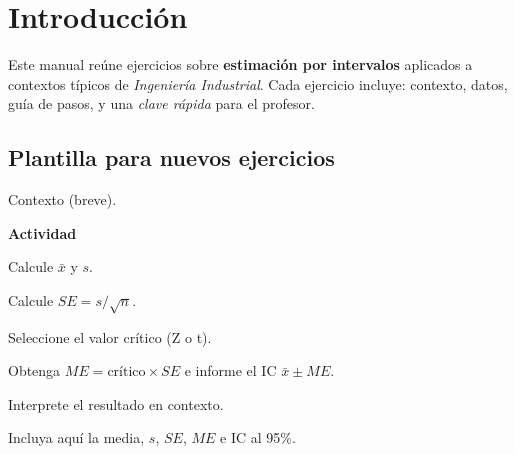 \section{Introducción}
Este manual reúne ejercicios sobre \textbf{estimación por intervalos} aplicados a contextos típicos de \textit{Ingeniería Industrial}.
Cada ejercicio incluye: contexto, datos, guía de pasos, y una \emph{clave rápida} para el profesor.

\begin{clave}
\subsection*{Plantilla para nuevos ejercicios}
\begin{ejercicio}
Contexto (breve).


\textbf{Actividad}
\begin{pasos}
  \item Calcule $\bar{x}$ y $s$.
  \item Calcule $SE=s/\sqrt{n}$.
  \item Seleccione el valor crítico (Z o t).
  \item Obtenga $ME=\text{crítico}\times SE$ e informe el IC $\bar{x}\pm ME$.
  \item Interprete el resultado en contexto.
\end{pasos}

\begin{clave}
Incluya aquí la media, $s$, $SE$, $ME$ e IC al 95\%.
\end{clave}
\end{ejercicio}
\end{clave}